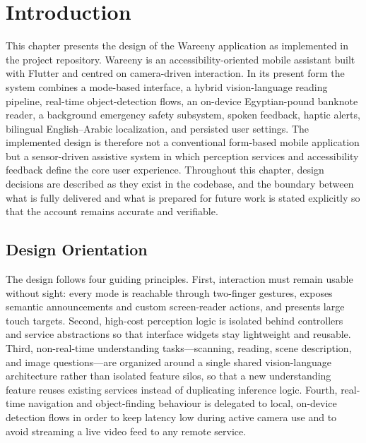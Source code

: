 \documentclass[12pt,a4paper]{report}
\begin{document}
\section{Introduction}
This chapter presents the design of the Wareeny application as implemented in the project repository. Wareeny is an accessibility-oriented mobile assistant built with Flutter and centred on camera-driven interaction. In its present form the system combines a mode-based interface, a hybrid vision-language reading pipeline, real-time object-detection flows, an on-device Egyptian-pound banknote reader, a background emergency safety subsystem, spoken feedback, haptic alerts, bilingual English--Arabic localization, and persisted user settings. The implemented design is therefore not a conventional form-based mobile application but a sensor-driven assistive system in which perception services and accessibility feedback define the core user experience. Throughout this chapter, design decisions are described as they exist in the codebase, and the boundary between what is fully delivered and what is prepared for future work is stated explicitly so that the account remains accurate and verifiable.

\subsection{Design Orientation}
The design follows four guiding principles. First, interaction must remain usable without sight: every mode is reachable through two-finger gestures, exposes semantic announcements and custom screen-reader actions, and presents large touch targets. Second, high-cost perception logic is isolated behind controllers and service abstractions so that interface widgets stay lightweight and reusable. Third, non-real-time understanding tasks---scanning, reading, scene description, and image questions---are organized around a single shared vision-language architecture rather than isolated feature silos, so that a new understanding feature reuses existing services instead of duplicating inference logic. Fourth, real-time navigation and object-finding behaviour is delegated to local, on-device detection flows in order to keep latency low during active camera use and to avoid streaming a live video feed to any remote service.
\end{document}
